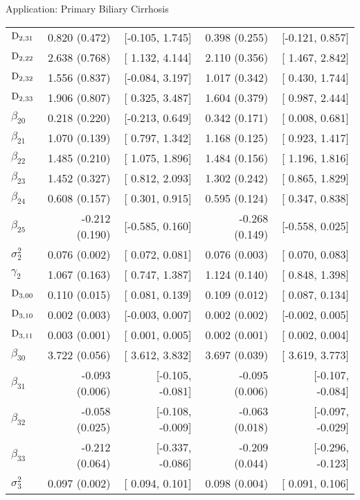 \begin{chapter}{\label{cha:app-PBC}Application: Primary Biliary Cirrhosis}
\begin{table}[ht]
\begin{tabular}{lrrrr}
        $\mathrm{D}_{2,31}$ & 0.820 (0.472) & [-0.105, 1.745] & 0.398 (0.255) & [-0.121, 0.857] \\ 
        $\mathrm{D}_{2,22}$ & 2.638 (0.768) & [ 1.132, 4.144] & 2.110 (0.356) & [ 1.467, 2.842] \\ 
        $\mathrm{D}_{2,32}$ & 1.556 (0.837) & [-0.084, 3.197] & 1.017 (0.342) & [ 0.430, 1.744] \\ 
        $\mathrm{D}_{2,33}$ & 1.906 (0.807) & [ 0.325, 3.487] & 1.604 (0.379) & [ 0.987, 2.444] \\ 
        $\beta_{20}$ &  0.218 (0.220) & [-0.213, 0.649] &  0.342 (0.171) & [ 0.008, 0.681] \\ 
        $\beta_{21}$ &  1.070 (0.139) & [ 0.797, 1.342] &  1.168 (0.125) & [ 0.923, 1.417] \\ 
        $\beta_{22}$ &  1.485 (0.210) & [ 1.075, 1.896] &  1.484 (0.156) & [ 1.196, 1.816] \\ 
        $\beta_{23}$ &  1.452 (0.327) & [ 0.812, 2.093] &  1.302 (0.242) & [ 0.865, 1.829] \\ 
        $\beta_{24}$ &  0.608 (0.157) & [ 0.301, 0.915] &  0.595 (0.124) & [ 0.347, 0.838] \\ 
        $\beta_{25}$ & -0.212 (0.190) & [-0.585, 0.160] & -0.268 (0.149) & [-0.558, 0.025] \\ 
        $\sigma^2_2$ &  0.076 (0.002) & [ 0.072, 0.081] &  0.076 (0.003) & [ 0.070, 0.083] \\ 
        $\gamma_2$ &  1.067 (0.163) & [ 0.747, 1.387] &  1.124 (0.140) & [ 0.848, 1.398] \\ 
        \hdashline
        $\mathrm{D}_{3,00}$ & 0.110 (0.015) & [ 0.081, 0.139] & 0.109 (0.012) & [ 0.087, 0.134] \\ 
        $\mathrm{D}_{3,10}$ & 0.002 (0.003) & [-0.003, 0.007] & 0.002 (0.002) & [-0.002, 0.005] \\ 
        $\mathrm{D}_{3,11}$ & 0.003 (0.001) & [ 0.001, 0.005] & 0.002 (0.001) & [ 0.002, 0.004] \\ 
        $\beta_{30}$ &  3.722 (0.056) & [ 3.612,  3.832] &  3.697 (0.039) & [ 3.619,  3.773] \\ 
        $\beta_{31}$ & -0.093 (0.006) & [-0.105, -0.081] & -0.095 (0.006) & [-0.107, -0.084] \\ 
        $\beta_{32}$ & -0.058 (0.025) & [-0.108, -0.009] & -0.063 (0.018) & [-0.097, -0.029] \\ 
        $\beta_{33}$ & -0.212 (0.064) & [-0.337, -0.086] & -0.209 (0.044) & [-0.296, -0.123] \\ 
        $\sigma^2_3$ &  0.097 (0.002) & [ 0.094,  0.101] &  0.098 (0.004) & [ 0.091,  0.106] \\ 

\end{tabular}
\end{table}
\end{chapter}
